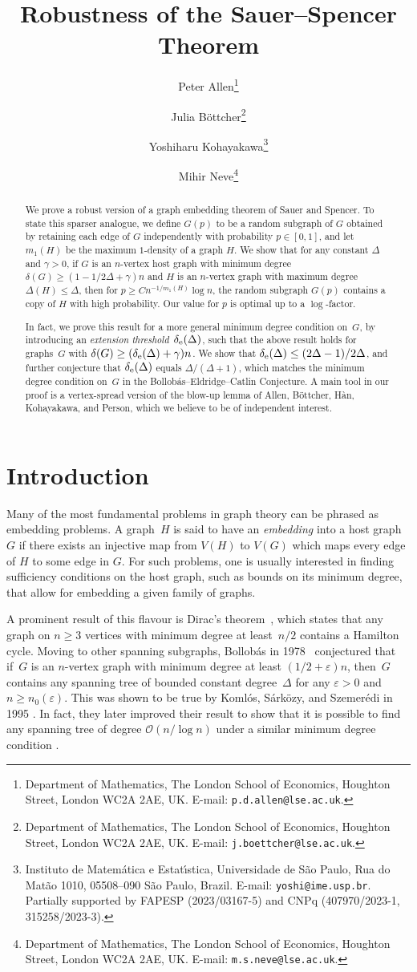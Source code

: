 \documentclass[final]{article}
\title{Robustness of the Sauer--Spencer Theorem}
\author{%
Peter Allen\thanks{Department of Mathematics, The London School of
Economics, Houghton Street, London WC2A 2AE, UK. E-mail: {\tt  p.d.allen@lse.ac.uk}.}
\and
Julia B\"{o}ttcher\thanks{Department of Mathematics, The London School of
Economics, Houghton Street, London WC2A 2AE, UK. E-mail: {\tt  j.boettcher@lse.ac.uk}.}
\and
Yoshiharu Kohayakawa\thanks{Instituto de Matem\'atica e
  Estat\'{\i}stica, Universidade de S\~ao Paulo, Rua do Mat\~ao 1010,
  05508–090 S\~ao Paulo, Brazil.  E-mail: {\tt yoshi@ime.usp.br}.
  Partially supported by FAPESP (2023/03167-5) and CNPq (407970/2023-1, 315258/2023-3).}
\and
Mihir Neve\thanks{Department of Mathematics, The London School of
Economics, Houghton Street, London WC2A 2AE, UK. E-mail: {\tt  m.s.neve@lse.ac.uk}.}
}
\date{}
\theoremstyle{definition}
\newcommand{\eps}{\varepsilon}
\newcommand{\exth}{\delta_{\rm e}(\Delta)}
\begin{document}
\maketitle

\begin{abstract}
We prove a robust version of a graph embedding theorem
of Sauer and Spencer. To state this sparser analogue, we define $G(p)$
to be a random subgraph of $G$ obtained by retaining each edge of $G$
independently with probability $p \in [0,1]$, and let $m_1(H)$ be the
maximum $1$-density of a graph $H$. We show that for any constant
$\Delta$ and $\gamma > 0$, if $G$ is an $n$-vertex host graph with minimum degree
$\delta(G) \geq (1 - 1/2\Delta + \gamma)n$ and $H$ is an $n$-vertex graph with
maximum degree $\Delta(H) \leq \Delta$, then for $p \geq
Cn^{-1/m_1(H)}\log n$, the random subgraph $G(p)$ contains a copy of
$H$ with high probability. Our value for $p$ is optimal up to a
$\log$-factor. 
\vspace{5pt}

In fact, we prove this result for a more general minimum degree 
condition on~$G$, by introducing an \emph{extension
threshold}~$\exth$, such that the above result holds for graphs~$G$
with ${\delta(G) \geq (\exth + \gamma)n}$. We show that
$\exth \leq (2\Delta-1)/2\Delta$, and further conjecture that
$\exth$ equals $\Delta/(\Delta+1)$, which matches the minimum degree condition on~$G$ in the
Bollob\'as--Eldridge--Catlin Conjecture. A main tool in our proof is a vertex-spread version of the blow-up lemma of
Allen, B\"{o}ttcher, H\`{a}n, Kohayakawa, and Person, which we believe
to be of independent interest.
\end{abstract}

\vspace{10pt}
\section{Introduction}

Many of the most fundamental problems in graph theory can be phrased as embedding problems.
A graph~$H$ is said to have an \emph{embedding} into a host
graph~$G$ if there exists an injective map from $V(H)$ to $V(G)$ which
maps every edge of $H$ to some edge in $G$. For such problems, one is
usually interested in finding sufficiency conditions on the host
graph, such as bounds on its minimum degree, that allow for embedding a given family of graphs.

A prominent result of this flavour is Dirac's
theorem~\cite{Dirac_theorem}, which states that any graph on $n\geq3$
vertices with minimum degree at least~$n/2$ contains a Hamilton
cycle. Moving to other spanning subgraphs,
Bollob\'{a}s in 1978~\cite{bollobás1978extremal} conjectured that
if~$G$ is an $n$-vertex graph with minimum degree at least
$(1/2 + \eps)n$, then~$G$ contains any spanning tree of bounded
constant degree~$\Delta$ for any $\eps>0$
and~$n\geq n_0(\eps)$. This was shown to be true by Koml\'{o}s,
S\'{a}rk\"{o}zy, and Szemer\'{e}di in 1995
\cite{Tree_embedding_komlos}. In fact, they later improved their
result to show that it is possible to find any spanning tree of
degree $\mathcal{O}(n/\!\log n)$ under a similar minimum degree condition \cite{spanning_trees_n_by_logn}.
\end{document}
